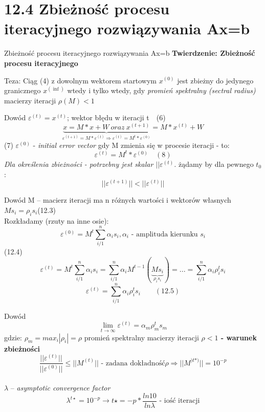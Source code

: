 \section{12.4 Zbieżność procesu iteracyjnego rozwiązywania Ax=b}

\begin{frame}{Zbieżność procesu iteracyjnego rozwiązywania Ax=b}
  \textbf{Twierdzenie: Zbieżność procesu iteracyjnego}
  \begin{block}{Teza:}
    \center Ciąg (4) z dowolnym wektorem startowym $x^{(0)}$ jest zbieżny do jedynego granicznego $x^{(\inf)}$ wtedy i tylko wtedy, gdy \emph{promień spektralny (sectral radius)} macierzy iteracji
    \center $\rho(M)<1$
  \end{block}
\end{frame}

\begin{frame}{}
  \begin{block}{Dowód}
    $\varepsilon^{(t)}=x^{(t)}$; wektor błędu w iteracji t$\quad$(6)
    \[\underbrace{x=M*x+W\ oraz\ x^{(t+1)}}_{\varepsilon^{(t+1)}=M*\varepsilon^{(t)} \Rightarrow \varepsilon^{(t)}=M^t*\varepsilon^{(0)}}=M*x^{(t)}+W\]
    (7) $\varepsilon^{(0)}$ - \emph{initial error vector} gdy M zmienia się w procesie iteracji - to:
    \[{\varepsilon}^{(t)}=M^t*{\varepsilon}^{(0)} \quad (8)\]
    \emph{Dla określenia zbieżności - potrzebny jest skalar $||\varepsilon^{(t)}$.}
    żądamy by dla pewnego $t_0$:
    \[||\varepsilon^{(t+1)}||<||\varepsilon^{(t)}||\]
  \end{block}
\end{frame}

\begin{frame}{}
  \begin{block}{Dowód}
    M -- macierz iteracji ma n różnych wartości i wektorów własnych
    \\\hfill$Ms_i=\rho _is_i$\hfill (12.3)
    \\Rozkładamy (rzuty na inne osie):
    \[\varepsilon^{(0)}=M^t \sum_{i/1}^{n} \alpha _i s_i , \alpha _i \text{ - amplituda kierunku } s_i\]
    \hfill\hfill(12.4)
    \[\varepsilon^{(t)}=M^t \sum_{i/1}^{n} \alpha _i s_i = \sum_{i/1}^{n} \alpha _i M^{t-1}(\underbrace{Ms_i}_{\rho _i s_i}) = ... = \sum_{i/1}^{n} \alpha _i \rho _i^t s_i \]
    \[\boxed{\varepsilon^{(t)}=\sum_{i/1}^{n} \alpha _i \rho _i^t s_i} \qquad (12.5)\]
  \end{block}
\end{frame}

\begin{frame}{}
  \begin{block}{Dowód}
    \[\lim_{t\to\infty} \varepsilon^{(t)} = \alpha _m \rho _m^t s_m\]
    gdzie: $\rho _m = max_i |\rho _i|= \rho$ promień spektralny macierzy iteracji
    \center \textbf{$\rho < 1$ - warunek zbieżności}
    $$ \frac{||\varepsilon^{(t)}||}{||\varepsilon^{(0)}||} \leq ||M^{(t)}|| \text{ - zadana dokładność} \rho\Rightarrow ||M^{)t*)}|| = 10^{-p}$$
    \\$\lambda$ -- \emph{asymptotic convergence factor}
    \[\lambda^{t\star}=10^{-p} \rightarrow t\star = -p* \frac{ln 10}{ln \lambda} \text{ - iość iteracji}\]
  \end{block}
\end{frame}
